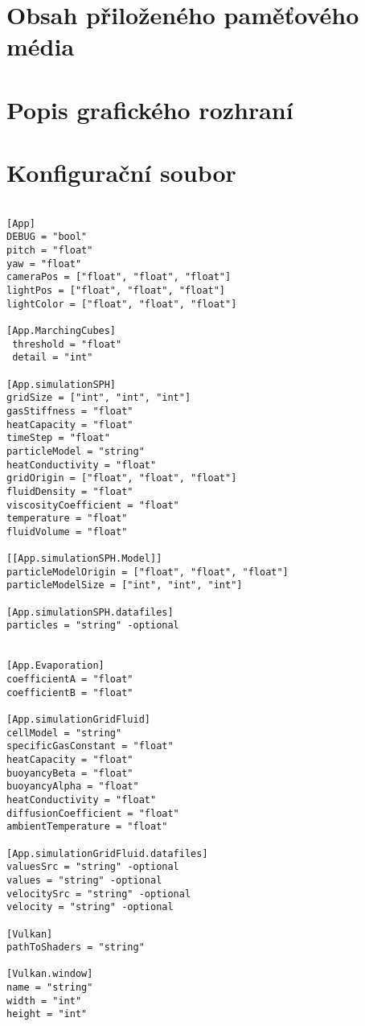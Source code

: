 
\chapter{Obsah přiloženého paměťového média}

\chapter{Popis grafického rozhraní}
\label{appendix:gui}

\chapter{Konfigurační soubor}
\label{appendix:configfile}

\begin{lstlisting}

[App]
DEBUG = "bool"
pitch = "float"
yaw = "float"
cameraPos = ["float", "float", "float"]
lightPos = ["float", "float", "float"]
lightColor = ["float", "float", "float"]

[App.MarchingCubes]
 threshold = "float"
 detail = "int"
 
[App.simulationSPH]
gridSize = ["int", "int", "int"]
gasStiffness = "float"
heatCapacity = "float"
timeStep = "float"
particleModel = "string"
heatConductivity = "float"
gridOrigin = ["float", "float", "float"]
fluidDensity = "float"
viscosityCoefficient = "float"
temperature = "float"
fluidVolume = "float"

[[App.simulationSPH.Model]]
particleModelOrigin = ["float", "float", "float"]
particleModelSize = ["int", "int", "int"]

[App.simulationSPH.datafiles]
particles = "string" -optional


[App.Evaporation]
coefficientA = "float"
coefficientB = "float"

[App.simulationGridFluid]
cellModel = "string"
specificGasConstant = "float"
heatCapacity = "float"
buoyancyBeta = "float"
buoyancyAlpha = "float"
heatConductivity = "float"
diffusionCoefficient = "float"
ambientTemperature = "float"

[App.simulationGridFluid.datafiles]
valuesSrc = "string" -optional
values = "string" -optional
velocitySrc = "string" -optional
velocity = "string" -optional

[Vulkan]
pathToShaders = "string"

[Vulkan.window]
name = "string"
width = "int"
height = "int"

\end{lstlisting}



